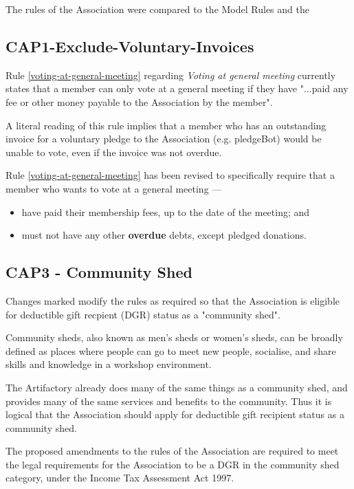 \documentclass[../constitution.tex]{subfiles}
\begin{document}
The rules of the Association were compared to the Model Rules and the 

\subsection*{CAP1-Exclude-Voluntary-Invoices}

Rule \ref{voting-at-general-meeting} regarding \textit{Voting at general meeting} currently states that a member can only vote at a general meeting if they have "...paid any fee or other money payable to the Association by the member".

A literal reading of this rule implies that a member who has an outstanding invoice for a voluntary pledge to the Association (e.g. pledgeBot) would be unable to vote, even if the invoice was not overdue.

Rule \ref{voting-at-general-meeting} has been revised to specifically require that a member who wants to vote at a general meeting ---

\begin{itemize}
    \item have paid their membership fees, up to the date of the meeting; and
    \item must not have any other \textbf{overdue} debts, except pledged donations.
\end{itemize}




\subsection*{CAP3 - Community Shed}

Changes marked  modify the rules as required so that the Association is eligible for deductible gift recpient (DGR) status as a "community shed".

Community sheds, also known as men's sheds or women's sheds, can be broadly defined as places where people can go to meet new people, socialise, and share skills and knowledge in a workshop environment.

The Artifactory already does many of the same things as a community shed, and provides many of the same services and benefits to the community. Thus it is logical that the Association should apply for deductible gift recipient status as a community shed.

The proposed amendments to the rules of the Association are required to meet the legal requirements for the Association to be a DGR in the community shed category, under the Income Tax Assessment Act 1997.
\end{document}
